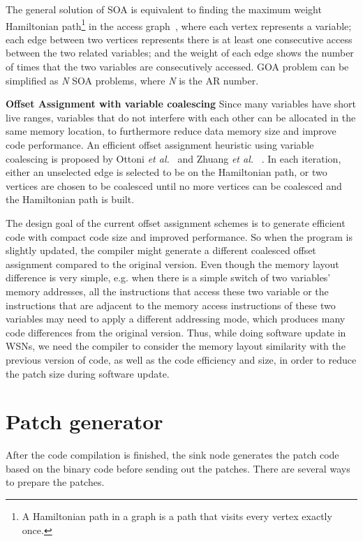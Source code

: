 The general solution of SOA is equivalent to finding the maximum weight Hamiltonian path\footnote{A Hamiltonian path in a graph is a path that visits every vertex exactly once.} in the access graph~\cite{related:bartley, related:liao}, where each vertex represents a variable; each edge between two vertices represents there is at least one consecutive access between the two related variables; and the weight of each edge shows the number of times that the two variables are consecutively accessed. GOA problem can be simplified as \textit{N} SOA problems, where \textit{N} is the AR number. 

\textbf{Offset Assignment with variable coalescing}
Since many variables have short live ranges, variables that do not interfere with each other can be allocated in the same memory location, to furthermore reduce data memory size and improve code performance. An efficient offset assignment heuristic using variable coalescing is proposed by Ottoni \textit{et al.}~\cite{related:ottoni} and Zhuang \textit{et al.} ~\cite{related:zhuang}. In each iteration, either an unselected edge is selected to be on the Hamiltonian path, or two vertices are chosen to be coalesced until no more vertices can be coalesced and the Hamiltonian path is built.

The design goal of the current offset assignment schemes is to generate efficient code with compact code size and improved performance. So when the program is slightly updated, the compiler might generate a different coalesced offset assignment compared to the original version. Even though the memory layout difference is very simple, e.g. when there is a simple switch of two variables' memory addresses, all the instructions that access these two variable or the instructions that are adjacent to the memory access instructions of these two variables may need to apply a different addressing mode, which produces many code differences from the original version. 
Thus, while doing software update in WSNs, we need the compiler to consider the memory layout similarity with the previous version of code, as well as the code efficiency and size, in order to reduce the patch size during software update.


\section{Patch generator}

After the code compilation is finished, the sink node generates the patch code based on the binary code before sending out the patches. There are several ways to prepare the patches.

